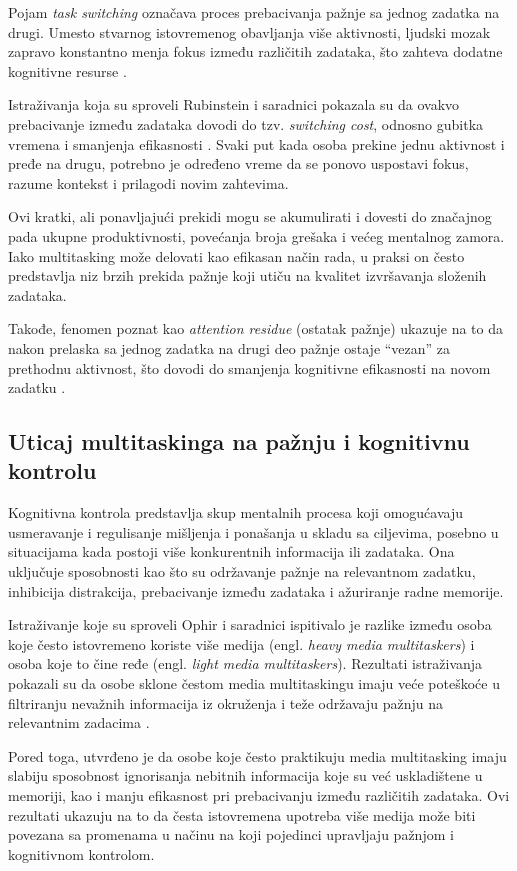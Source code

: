 \documentclass[12pt,a4paper]{article}
\begin{document}
Pojam \textit{task switching} označava proces prebacivanja pažnje sa jednog zadatka na drugi. Umesto stvarnog istovremenog obavljanja više aktivnosti, ljudski mozak zapravo konstantno menja fokus između različitih zadataka, što zahteva dodatne kognitivne resurse \cite{rubinstein2001}.

Istraživanja koja su sproveli Rubinstein i saradnici pokazala su da ovakvo prebacivanje između zadataka dovodi do tzv. \textit{switching cost}, odnosno gubitka vremena i smanjenja efikasnosti \cite{rubinstein2001}. Svaki put kada osoba prekine jednu aktivnost i pređe na drugu, potrebno je određeno vreme da se ponovo uspostavi fokus, razume kontekst i prilagodi novim zahtevima.

Ovi kratki, ali ponavljajući prekidi mogu se akumulirati i dovesti do značajnog pada ukupne produktivnosti, povećanja broja grešaka i većeg mentalnog zamora. Iako multitasking može delovati kao efikasan način rada, u praksi on često predstavlja niz brzih prekida pažnje koji utiču na kvalitet izvršavanja složenih zadataka.

Takođe, fenomen poznat kao \textit{attention residue} (ostatak pažnje) ukazuje na to da nakon prelaska sa jednog zadatka na drugi deo pažnje ostaje “vezan” za prethodnu aktivnost, što dovodi do smanjenja kognitivne efikasnosti na novom zadatku \cite{leroy2009}.

\subsection{Uticaj multitaskinga na pažnju i kognitivnu kontrolu}

Kognitivna kontrola predstavlja skup mentalnih procesa koji omogućavaju usmeravanje i regulisanje mišljenja i ponašanja u skladu sa ciljevima, posebno u situacijama kada postoji više konkurentnih informacija ili zadataka. Ona uključuje sposobnosti kao što su održavanje pažnje na relevantnom zadatku, inhibicija distrakcija, prebacivanje između zadataka i ažuriranje radne memorije.

Istraživanje koje su sproveli Ophir i saradnici ispitivalo je razlike između osoba koje često istovremeno koriste više medija (engl. \textit{heavy media multitaskers}) i osoba koje to čine ređe (engl. \textit{light media multitaskers}). Rezultati istraživanja pokazali su da osobe sklone čestom media multitaskingu imaju veće poteškoće u filtriranju nevažnih informacija iz okruženja i teže održavaju pažnju na relevantnim zadacima \cite{ophir2009}.

Pored toga, utvrđeno je da osobe koje često praktikuju media multitasking imaju slabiju sposobnost ignorisanja nebitnih informacija koje su već uskladištene u memoriji, kao i manju efikasnost pri prebacivanju između različitih zadataka. Ovi rezultati ukazuju na to da česta istovremena upotreba više medija može biti povezana sa promenama u načinu na koji pojedinci upravljaju pažnjom i kognitivnom kontrolom.
\end{document}
